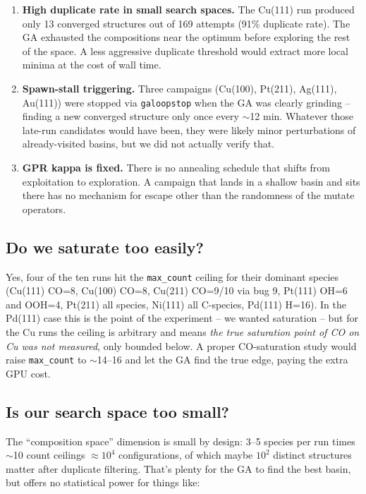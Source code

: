 \documentclass[11pt,a4paper]{article}
\begin{document}
\begin{enumerate}
  \item \textbf{High duplicate rate in small search spaces.} The
    Cu(111) run produced only 13 converged structures out of 169
    attempts (91\% duplicate rate). The GA exhausted the compositions
    near the optimum before exploring the rest of the space. A less
    aggressive duplicate threshold would extract more local minima
    at the cost of wall time.
  \item \textbf{Spawn-stall triggering.} Three campaigns (Cu(100),
    Pt(211), Ag(111), Au(111)) were stopped via
    \texttt{galoopstop} when the GA was clearly grinding -- finding
    a new converged structure only once every $\sim$12 min.
    Whatever those late-run candidates would have been, they were
    likely minor perturbations of already-visited basins, but we
    did not actually verify that.
  \item \textbf{GPR kappa is fixed.} There is no annealing schedule
    that shifts from exploitation to exploration. A campaign that
    lands in a shallow basin and sits there has no mechanism for
    escape other than the randomness of the mutate operators.
\end{enumerate}

\subsection{Do we saturate too easily?}

Yes, four of the ten runs hit the \texttt{max\_count} ceiling for
their dominant species (Cu(111) CO=8, Cu(100) CO=8, Cu(211) CO=9/10
via bug 9, Pt(111) OH=6 and OOH=4, Pt(211) all species, Ni(111)
all C-species, Pd(111) H=16). In the Pd(111) case this is the
point of the experiment -- we wanted saturation -- but for the Cu
runs the ceiling is arbitrary and means \emph{the true saturation
point of CO on Cu was not measured}, only bounded below. A proper
CO-saturation study would raise \texttt{max\_count} to $\sim$14--16
and let the GA find the true edge, paying the extra GPU cost.

\subsection{Is our search space too small?}

The ``composition space'' dimension is small by design: 3--5 species
per run times $\sim$10 count ceilings $\approx 10^{4}$ configurations,
of which maybe $10^{2}$ distinct structures matter after duplicate
filtering. That's plenty for the GA to find the best basin, but
offers no statistical power for things like:
\end{document}
